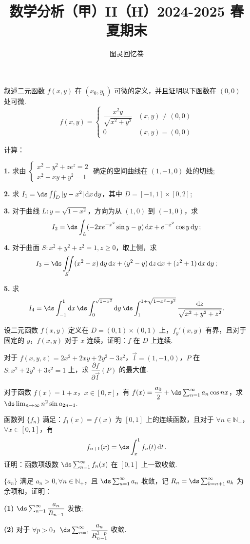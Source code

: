 \documentclass[UTF8,14pt,normal]{ctexart}
\title{\vspace{-4em}\textbf{数学分析（甲）II（H）2024-2025 春夏期末}}
\author{图灵回忆卷}
\begin{document}
\maketitle

 叙述二元函数 $f(x, y)$ 在 $(x_0, y_0)$ 可微的定义，并且证明以下函数在 $(0, 0)$ 处可微. \[f(x, y) = \begin{cases}
    \dfrac{x^2y}{\sqrt{x^2 + y^2}}  & (x, y) \neq (0, 0)\\
    0                                    & (x, y) = (0, 0)
\end{cases}\]

 计算：

\textbf{1.} 求由 $\begin{cases}
    x^2+y^2+ze^z=2 \\
    x^2+xy+y^2=1 
\end{cases}$ 确定的空间曲线在 $(1,-1,0)$ 处的切线;

\textbf{2.} 求 $I_1=\ds\iint_D |y-x^2|\dd{x}\dd{y}$，其中 $D=\left[-1, 1\right]\times\left[0,2\right]$;

\textbf{3.} 对于曲线 $L \colon y = \sqrt{1-x^2}$，方向为从 $(1, 0)$ 到 $(-1, 0)$，求 \[I_2=\ds\int_L(-2xe^{-x^2}\sin y-y)\dd{x} + e^{-x^2}\cos{y} \dd{y};\]

\textbf{4.} 对于曲面 $S \colon x^2+y^2+z^2=1, z\ge 0$，取上侧，求 \[I_3=\ds\iint\limits_{S}(x^2 - x)\dd{y}\dd{z} + (y^2 - y)\dd{z}\dd{x} + (z^2 + 1)\dd{x}\dd{y};\]

\textbf{5.} 求 \[I_4 = \ds\int_{-1}^1 \dd{x} \ds\int_0^{\sqrt{1-x^2}} \dd{y} \ds\int_1^{1+\sqrt{1-x^2-y^2}} \dfrac{\dd{z}}{\sqrt{x^2+y^2+z^2}}.\]

 设二元函数 $f(x, y)$ 定义在 $D=(0,1)\times(0,1)$ 上，$f_y'(x,y)$ 有界，且对于固定的 $y$，$f(x,y)$ 对于 $x$ 连续，证明：$f$ 在 $D$ 上连续.

 对于 $f(x,y,z)=2x^2+2xy+2y^2-3z^2$，$\vec{l}=(1,-1,0)$，$P$ 在 $S\colon x^2+2y^2+3z^2=1$ 上，求 $\dfrac{\partial f}{\partial\vec{l}}(P)$ 的最大值.

 对于函数 $f(x)=1+x$，$x\in\left[0,\pi\right]$，有 $f(x)=\dfrac{a_0}{2}+\ds\sum_{n=1}^\infty a_n\cos nx$，求 $\ds\lim_{n\to\infty}n^2\sin{a_{2n-1}}.$

 函数列 $\{f_n\}$ 满足：$f_1(x)=f(x)$ 为 $\left[0,1\right]$ 上的连续函数，且对于 $\forall n\in\mathbb{N}_+$，$\forall x\in[0,1]$，有 \[f_{n+1}(x)=\ds\int_x^1f_n(t)\dd{t}.\] 证明：函数项级数 $\ds\sum_{n=1}^{\infty}f_n(x)$ 在 $[0,1]$ 上一致收敛.

 $\{a_n\}$ 满足 $a_n>0,\forall n\in\mathbb{N}_+$，且 $\ds\sum_{n=1}^\infty a_n$ 收敛，记 $R_n=\ds\sum_{k=n+1}^\infty a_k$ 为余项和，证明：

\textbf{(1)} $\ds\sum_{n=1}^\infty \dfrac{a_n}{R_{n-1}}$ 发散;

\textbf{(2)} 对于 $\forall p>0$，$\ds\sum_{n=1}^\infty \dfrac{a_n}{R_{n-1}^{1-p}}$ 收敛.
\end{document}
